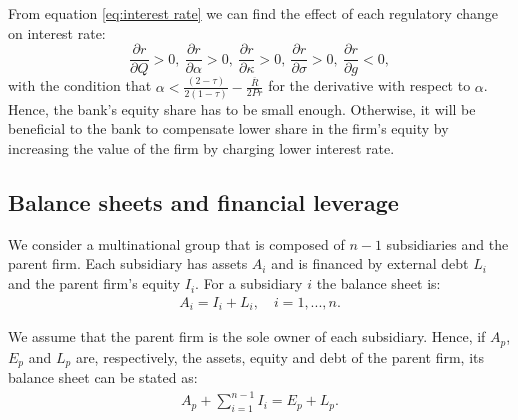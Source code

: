 \documentclass[12pt]{article}
\begin{document}
	From equation \ref{eq:interest rate} we can find the effect of each regulatory change on interest rate: 
		\begin{equation}
	\frac{\partial r}{\partial Q}>0, \ \frac{\partial r}{\partial \alpha}>0, \
	\frac{\partial r}{\partial \kappa}>0, \
	\frac{\partial r}{\partial \sigma}>0, \
	\frac{\partial r}{\partial g}<0,
		\label{eq:derivatives}
	\end{equation}
	with the condition that $\alpha<\frac{(2-\tau)}{2(1-\tau)}-\frac{\overline{R}}{2Pr}$ for the derivative with respect to $\alpha$. Hence, the bank's equity share has to be small enough. Otherwise, it will be beneficial to the bank to compensate lower share in the firm's equity by increasing the value of the firm by charging lower interest rate. 
	       
	\subsection{Balance sheets and financial leverage}
	\label{subsec:balancesheet}
	We consider a multinational group that is composed of $n-1$ subsidiaries and the parent firm. Each subsidiary has assets $A_i$ and is financed by external debt $L_i$ and the parent firm's equity $I_i$. For a subsidiary $i$ the balance sheet is:
	\begin{equation}
	\begin{aligned}
	A_i=I_i+L_i, \quad i=1,...,n.
	\end{aligned}
	\label{eq:sub balance sheet}
	\end{equation}
	
	We assume that the parent firm is the sole owner of each subsidiary. Hence, if $A_p$, $E_p$ and $L_p$ are, respectively, the assets, equity and debt of the parent firm, its balance sheet can be stated as: 
	\begin{equation}
	\begin{aligned}
	A_p+\sum_{i=1}^{n-1}I_i=E_p+L_p. 
	\end{aligned}
	\label{eq:parent balance sheet}
	\end{equation}
	
\end{document}
